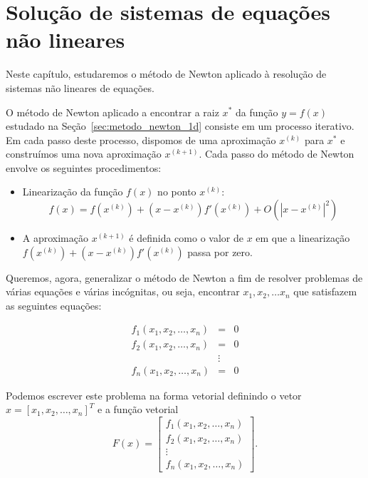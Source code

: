 
%

\chapter{Solução de sistemas de equações não lineares}
Neste capítulo, estudaremos o método de Newton aplicado à resolução de sistemas não lineares de equações.

O método de Newton aplicado a encontrar a raiz $x^*$ da função $y=f(x)$ estudado na Seção~\ref{sec:metodo_newton_1d} consiste em um processo iterativo. Em cada passo deste processo, dispomos de uma aproximação $x^{(k)}$ para $x^*$ e construímos uma nova aproximação $x^{(k+1)}$.  Cada passo do método de Newton envolve os seguintes procedimentos:
\begin{itemize}
\item Linearização da função $f(x)$ no ponto $x^{(k)}$:
  \begin{equation*}
    f(x)= f(x^{(k)})+ (x-x^{(k)}) f'(x^{(k)}) + O\left(|x-x^{(k)}|^2\right)
  \end{equation*}
\item A aproximação $x^{(k+1)}$ é definida como o valor de $x$ em que a linearização $f(x^{(k)})+ (x-x^{(k)}) f'(x^{(k)})$ passa por zero.
\end{itemize}


Queremos, agora, generalizar o método de Newton a fim de resolver problemas de várias equações e várias incógnitas, ou seja, encontrar $x_1,x_2,\ldots x_n$ que satisfazem as seguintes equações:

\begin{eqnarray*}
f_1(x_1,x_2,\ldots,x_n)&=&0\\
f_2(x_1,x_2,\ldots,x_n)&=&0\\
&\vdots&\\
f_n(x_1,x_2,\ldots,x_n)&=&0
\end{eqnarray*}

Podemos escrever este problema na forma vetorial definindo o vetor $x=[x_1,x_2,\ldots,x_n]^T$ e a função vetorial
$$F(x)=\left[
\begin{array}{c}
f_1(x_1,x_2,\ldots,x_n)\\
f_2(x_1,x_2,\ldots,x_n)\\
\vdots\\
f_n(x_1,x_2,\ldots,x_n)
\end{array}
\right].$$

